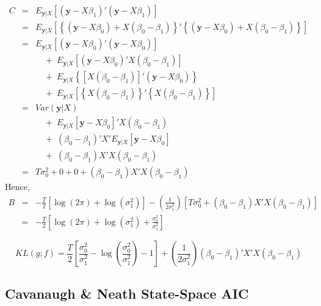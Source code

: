 \documentclass[12pt]{article}
\theoremstyle{definition}
\begin{document}
\begin{eqnarray*}
	C &=& E_{\mathbf{y}|X}\left[\left(\textbf{y} - X\beta_1\right)'\left(\textbf{y} -X\beta_1\right)\right]\\
		&=&E_{\mathbf{y}|X}\left[\left\{ \left(\mathbf{y} - X\beta_0\right) + X\left(\beta_0 - \beta_1\right)\right\}'\left\{ \left(\mathbf{y} - X\beta_0\right)+ X\left(\beta_0 - \beta_1\right)\right\} \right]\\ 
	&=& E_{\mathbf{y}|X}\left[\left(\mathbf{y} - X\beta_0\right)'\left(\mathbf{y} - X\beta_0\right)\right] \\
	&&\quad +\; E_{\mathbf{y}|X}\left[\left(\mathbf{y} -X\beta_0\right)'X\left(\beta_0 - \beta_1\right)\right] \\
	&& \quad +\;  E_{\mathbf{y}|X}\left\{\left[X\left(\beta_0 -\beta_1 \right) \right]'\left(\mathbf{y} - X\beta_0 \right)\right\} \\
	&& \quad + \;E_{\mathbf{y}|X}\left[\left\{X\left(\beta_0 - \beta_1\right)\right\}'\left\{X\left(\beta_0 - \beta_1\right)\right\} \right]\\ 
		&=& Var(\mathbf{y}|X)\\
		&&\quad +\; E_{\mathbf{y}|X}\left[\mathbf{y} - X\beta_0 \right]'X(\beta_0 -\beta_1) \\
		&& \quad + \;(\beta_0 -\beta_1)'X'E_{\mathbf{y}|X}\left[\mathbf{y} - X\beta_0 \right] \\
		&& \quad + \; (\beta_0 - \beta_1)X'X(\beta_0 - \beta_1)\\
	&=& T\sigma_0^2 + 0 + 0 + (\beta_0 - \beta_1)X'X(\beta_0 - \beta_1)
\end{eqnarray*}
Hence,
\begin{eqnarray*}
	B &=& -\frac{T}{2}\left[\log(2\pi) + \log(\sigma^2_1) \right] - \left(\frac{1}{2\sigma_1^2}\right) \left[ T\sigma_0^2 + (\beta_0 - \beta_1)X'X(\beta_0 - \beta_1)\right]\\
		&=& -\frac{T}{2}\left[\log(2\pi) + \log(\sigma^2_1) + \frac{\sigma_0^2}{\sigma_1^2}\right]
\end{eqnarray*}

	$$KL(g;f) =  \frac{T}{2}\left[\frac{\sigma_0^2}{\sigma_1^2} - \log\left(\frac{\sigma_0^2}{\sigma_1^2}\right) - 1 \right] + \left(\frac{1}{2 \sigma_1^2}\right)\left(\beta_0 - \beta_1\right)'X'X\left(\beta_0 - \beta_1\right)$$

\subsection{Cavanaugh \& Neath State-Space AIC}
\end{document}
